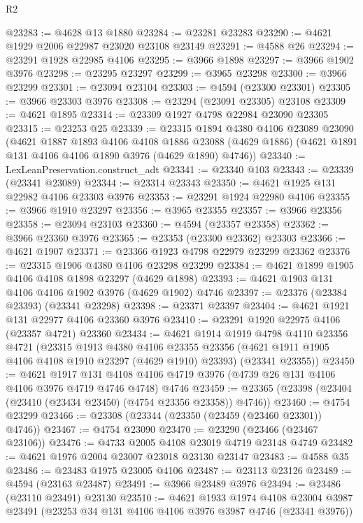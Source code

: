 \begin{lexlean}{R2}
\begin{coremodule}
@23283 := @4628 @13 @1880
@23284 := @23281 @23283
@23290 := @4621 @1929 @2006 @22987 @23020 @23108 @23149
@23291 := @4588 @26
@23294 := @23291 @1928 @22985 @4106
@23295 := @3966 @1898
@23297 := @3966 @1902 @3976
@23298 := @23295 @23297
@23299 := @3965 @23298
@23300 := @3966 @23299
@23301 := @23094 @23104
@23303 := @4594 (@23300 @23301)
@23305 := @3966 @23303 @3976
@23308 := @23294 (@23091 @23305) @23108
@23309 := @4621 @1895
@23314 := @23309 @1927 @4798 @22984 @23090 @23305
@23315 := @23253 @25
@23339 := @23315
    @1894
    @4380
    @4106
    @23089
    @23090
    (@4621
      @1887
      @1893
      @4106
      @4108
      @1886
      @23088
      (@4629 @1886)
      (@4621 @1891 @131 @4106 @4106 @1890 @3976 (@4629 @1890) @4746))
@23340 := LexLeanPreservation.construct_adt
@23341 := @23340 @103
@23343 := @23339 (@23341 @23089)
@23344 := @23314 @23343
@23350 := @4621 @1925 @131 @22982 @4106 @23303 @3976
@23353 := @23291 @1924 @22980 @4106
@23355 := @3966 @1910 @23297
@23356 := @3965 @23355
@23357 := @3966 @23356
@23358 := @23094 @23103
@23360 := @4594 (@23357 @23358)
@23362 := @3966 @23360 @3976
@23365 := @23353 (@23300 @23362) @23303
@23366 := @4621 @1907
@23371 := @23366 @1923 @4798 @22979 @23299 @23362
@23376 := @23315 @1906 @4380 @4106 @23298 @23299
@23384 := @4621 @1899 @1905 @4106 @4108 @1898 @23297 (@4629 @1898)
@23393 := @4621 @1903 @131 @4106 @4106 @1902 @3976 (@4629 @1902) @4746
@23397 := @23376 (@23384 @23393) (@23341 @23298)
@23398 := @23371 @23397
@23404 := @4621 @1921 @131 @22977 @4106 @23360 @3976
@23410 := @23291 @1920 @22975 @4106 (@23357 @4721) @23360
@23434 := @4621
    @1914
    @1919
    @4798
    @4110
    @23356
    @4721
    (@23315
      @1913
      @4380
      @4106
      @23355
      @23356
      (@4621 @1911 @1905 @4106 @4108 @1910 @23297 (@4629 @1910) @23393)
      (@23341 @23355))
@23450 := @4621
    @1917
    @131
    @4108
    @4106
    @4719
    @3976
    (@4739 @26 @131 @4106 @4106 @3976 @4719 @4746 @4748)
    @4746
@23459 := @23365 (@23398 (@23404 (@23410 (@23434 @23450) (@4754 @23356 @23358)) @4746))
@23460 := @4754 @23299
@23466 := @23308 (@23344 (@23350 (@23459 (@23460 @23301)) @4746))
@23467 := @4754 @23090
@23470 := @23290 (@23466 (@23467 @23106))
@23476 := @4733 @2005 @4108 @23019 @4719 @23148 @4749
@23482 := @4621 @1976 @2004 @23007 @23018 @23130 @23147
@23483 := @4588 @35
@23486 := @23483 @1975 @23005 @4106
@23487 := @23113 @23126
@23489 := @4594 (@23163 @23487)
@23491 := @3966 @23489 @3976
@23494 := @23486 (@23110 @23491) @23130
@23510 := @4621
    @1933
    @1974
    @4108
    @23004
    @3987
    @23491
    (@23253 @34 @131 @4106 @4106 @3976 @3987 @4746 (@23341 @3976))

\end{coremodule}
\end{lexlean}
